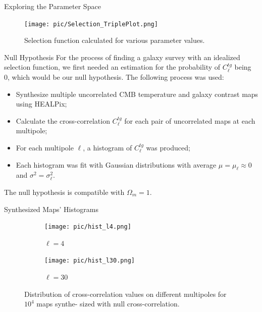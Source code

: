 \documentclass[serif, aspectratio=169]{beamer}
\begin{document}
\begin{frame}{Exploring the Parameter Space}
    \begin{figure}
        \centering
        \texttt{[image: pic/Selection\_TriplePlot.png]}
        \caption{Selection function calculated for various parameter values.}
        \label{fig:selection_triplePlot}
    \end{figure}
\end{frame}

\begin{frame}{Null Hypothesis}
    For the process of finding a galaxy survey with an idealized selection function, we first needed an estimation for the probability of $C_\ell^{tg}$ being 0, which would be our null hypothesis. The following process was used: 

    \begin{itemize}
        \item Synthesize multiple uncorrelated CMB temperature and galaxy contrast maps using HEALPix;
        \item Calculate the cross-correlation $C_\ell^{tg}$ for each pair of uncorrelated maps at each multipole;
        \item For each multipole $\ell$, a histogram of $C_\ell^{tg}$ was produced;
        \item Each histogram was fit with Gaussian distributions with average $\mu=\mu_\ell\approx 0$ and $\sigma^2=\sigma_\ell^2$.
    \end{itemize}
    
    The null hypothesis is compatible with $\Omega_m=1$.
\end{frame}

\begin{frame}{Synthesized Maps' Histograms}
    \begin{figure}

        \begin{subfigure}[b]{0.45\linewidth}
            \centering
            \texttt{[image: pic/hist\_l4.png]}
            \caption{$\ell=4$}
            \label{fig:hist_l4}
        \end{subfigure}
        \hfill
        \begin{subfigure}[b]{0.45\linewidth}
            \centering
            \texttt{[image: pic/hist\_l30.png]}
            \caption{$\ell=30$}
            \label{fig:hist_l30}
        \end{subfigure}
        
        \caption{Distribution of cross-correlation values on different multipoles for $10^4$ maps synthe-
sized with null cross-correlation.}
        \label{fig:hists}
    \end{figure}
\end{frame}
\end{document}
